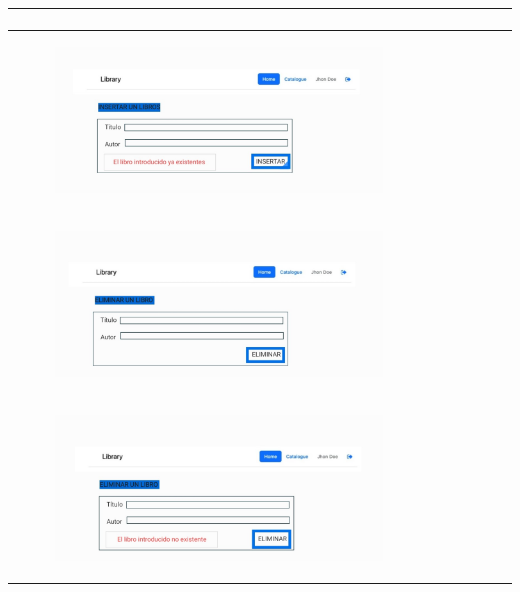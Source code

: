 \documentclass{report}
\begin{document}
\begin{center}
\begin{longtable}{|p{\linewidth}|}
\begin{figure}[H]
                            \end{figure}\\
                            \hline
                            \begin{figure}[H]
                                \centering
                                \includegraphics[width=0.8\textwidth]{./img/grafico/ErrorInsertarLibro.jpg}
                            \end{figure}\\
                            \hline
                            \begin{figure}[H]
                                \centering
                                \includegraphics[width=0.8\textwidth]{./img/grafico/EliminarLibro.jpg}
                            \end{figure}\\
                            \hline
                            \begin{figure}[H]
                                \centering
                                \includegraphics[width=0.8\textwidth]{./img/grafico/ErrorEliminarLibro.jpg}

\end{figure}
\end{longtable}
\end{center}
\end{document}
